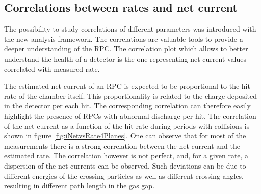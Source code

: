 \subsection{Correlations between rates and net current}
The possibility to study correlations of different parameters was introduced with the new analysis framework.
The correlations are valuable tools to provide a deeper understanding of the RPC.
The correlation plot which allows to better understand the health of a detector is the one representing net current values correlated with measured rate.

The estimated net current of an RPC is expected to be proportional to the hit rate of the chamber itself.
This proportionality is related to the charge deposited in the detector per each hit.
The corresponding correlation can therefore easily highlight the presence of RPCs with abnormal discharge per hit.
The correlation of the net current as a function of the hit rate during periods with collisions is shown in figure \ref{fig:iNetvsRate4Planes}.
One can observe that for most of the measurements there is a strong correlation between the net current and the estimated rate. 
The correlation however is not perfect, and, for a given rate, a dispersion of the net currents can be observed.
Such deviations can be due to different energies of the crossing particles as well as different crossing angles, resulting in different path length in the gas gap.

